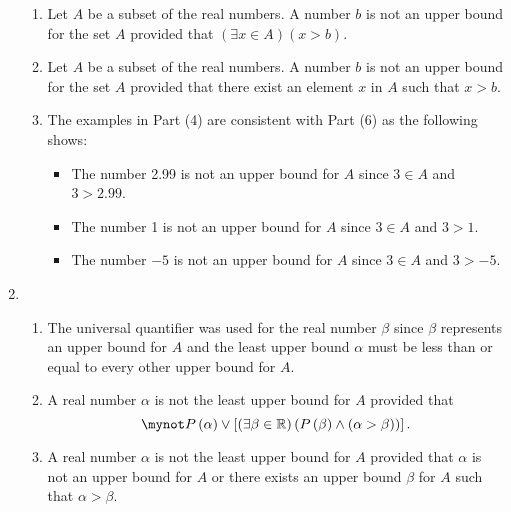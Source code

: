 \begin{enumerate}
\begin{enumerate}
\item Let  $A$  be a subset of the real numbers.  A number  $b$  is not an upper bound for the set  $A$   provided that  $\left( \exists x \in A\right) \left( x > b \right)$.

\item Let  $A$  be a subset of the real numbers.  A number  $b$  is not an upper bound for the set  $A$  provided that there exist an element  $x$  in  $A$  such that  $x > b$.

\item The examples in Part (4) are consistent with  Part (6) as the following shows:

\begin{itemize}
\item The number 2.99  is not an upper bound for  $A$  since  $3 \in A$ and  $3 > 2.99$.

\item The number 1  is not an upper bound for  $A$  since  $3 \in A$ and  $3 > 1$.

\item The number $-5$  is not an upper bound for  $A$  since  $3 \in A$ and  $3 >  - 5$.
\end{itemize}

\end{enumerate}




\item \begin{enumerate}
\item The universal quantifier was used for the real number  $\beta $
  since  $\beta $  represents an upper bound for  $A$  and the least upper bound  $\alpha $
 must be less than or equal to every other upper bound for  $A$.


\item A real number  $\alpha $ is not the least upper bound for  $A$  provided that  
\[
\mynot P\left( \alpha  \right) \vee \left[ {\left( {\exists \beta  \in \mathbb{R}} \right)\left( {P\left( \beta  \right) \wedge \left( {\alpha  > \beta } \right)} \right)} \right].
\]

\item A real number  $\alpha $ is not the least upper bound for  $A$  provided that  $\alpha $ is not an upper bound for  $A$  or there exists an upper bound  $\beta $  for  $A$  such that  $\alpha  > \beta $.
\end{enumerate}



\end{enumerate}
\hbreak
\endinput

